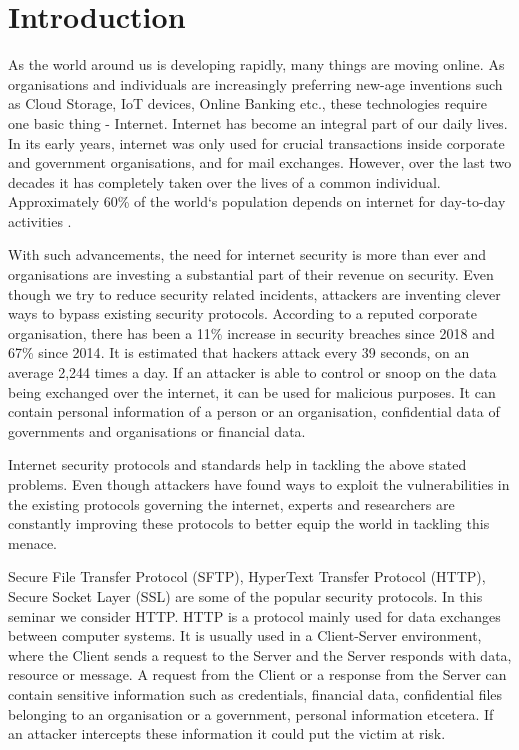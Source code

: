 \chapter{Introduction}

As the world around us is developing rapidly, many things are moving online. As organisations and individuals are increasingly preferring new-age inventions such as Cloud Storage, IoT devices, Online Banking etc., these technologies require one basic thing - Internet. Internet has become an integral part of our daily lives. In its early years, internet was only used for crucial transactions inside corporate and government organisations, and for mail exchanges. However, over the last two decades it has completely taken over the lives of a common individual. Approximately 60\% of the world`s population depends on internet for day-to-day activities \cite{b16}. 

With such advancements, the need for internet security is more than ever and organisations are investing a substantial part of their revenue on security\cite{b2}. Even though we try to reduce security related incidents, attackers are inventing clever ways to bypass existing security protocols. According to a reputed corporate organisation, there has been a 11\% increase in security breaches since 2018 and 67\% since 2014\cite{b3}. It is estimated that hackers attack every 39 seconds, on an average 2,244 times a day\cite{b4}. If an attacker is able to control or snoop on the data being exchanged over the internet, it can be used for malicious purposes. It can contain personal information of a person or an organisation, confidential data of governments and organisations or financial data.

Internet security protocols and standards help in tackling the above stated problems. Even though attackers have found ways to exploit the vulnerabilities in the existing protocols governing the internet, experts and researchers are constantly improving these protocols to better equip the world in tackling this menace.  

Secure File Transfer Protocol (SFTP), HyperText Transfer Protocol (HTTP), Secure Socket Layer (SSL) are some of the popular security protocols. In this seminar we consider HTTP. HTTP is a protocol mainly used for data exchanges between computer systems. It is usually used in a Client-Server environment, where the Client sends a request to the Server and the Server responds with data, resource or message. A request from the Client or a response from the Server can contain sensitive information such as credentials, financial data, confidential files belonging to an organisation or a government, personal information etcetera. If an attacker intercepts these information it could put the victim at risk.  

